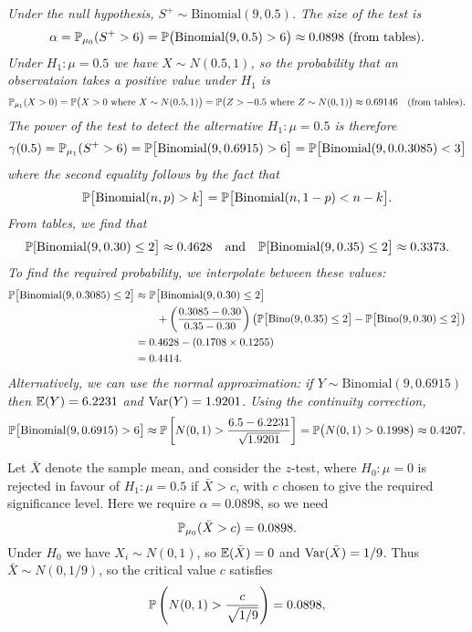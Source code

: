 \begin{exercise}
\begin{questions}
\begin{answer}
\ben
\it %
Under the null hypothesis, $S^{+}\sim\text{Binomial}(9, 0.5)$. The size of the test is
\[
\alpha = \mathbb{P}_{\mu_0}(S^{+}>6) = \mathbb{P}\big(\text{Binomial}(9,0.5)>6\big) \approx 0.0898 \text{ (from tables)}.
\]
Under $H_1:\mu=0.5$ we have $X\sim N(0.5,1)$, so the probability that an observataion takes a positive value under $H_1$ is
\[
\mathbb{P}_{\mu_1}(X > 0) 
	= \mathbb{P}\big(X > 0 \text{ where } X\sim N(0.5,1)\big) 
	= \mathbb{P}\big(Z > -0.5 \text{ where } Z\sim N(0,1)\big) 
	\approx 0.69146 \quad\text{(from tables).}
\]
The power of the test to detect the alternative $H_1:\mu=0.5$ is therefore
\[
\gamma(0.5) = \mathbb{P}_{\mu_1}(S^{+}>6) = \mathbb{P}\big[\text{Binomial}(9,0.6915) > 6\big] = \mathbb{P}\big[\text{Binomial}(9,0.0.3085) < 3\big] 
\]
where the second equality follows by the fact that 
\[
\mathbb{P}\big[\text{Binomial}(n,p) > k\big] = \mathbb{P}\big[\text{Binomial}(n,1-p) < n-k\big].
\]
From tables, we find that 
\[
\mathbb{P}[\text{Binomial}(9,0.30)\leq 2\big] \approx 0.4628  \quad\text{and}\quad \mathbb{P}[\text{Binomial}(9,0.35)\leq 2\big] \approx 0.3373.
\]
To find the required probability, we interpolate between these values:
\begin{align*}
\mathbb{P}\big[\text{Binomial}(9,0.3085)\leq 2\big]
	& \approx \mathbb{P}\big[\text{Binomial}(9,0.30)\leq 2\big] \\
	& \qquad + \left(\frac{0.3085 - 0.30}{0.35 - 0.30}\right)\left(\mathbb{P}\big[\text{Bino}(9,0.35)\leq 2\big]-\mathbb{P}\big[\text{Bino}(9,0.30)\leq 2\big]\right) \\
	& = 0.4628 - (0.1708\times 0.1255) \\
	& = 0.4414.
\end{align*}	
Alternatively, we can use the normal approximation: if $Y\sim \text{Binomial}(9,0.6915)$ then $\mathbb{E}(Y) = 6.2231$ and $\text{Var}(Y) = 1.9201$. Using the continuity correction,
\[
\mathbb{P}\big[\text{Binomial}(9,0.6915) > 6\big]
	\approx \mathbb{P}\left[ N (0,1) > \frac{6.5-6.2231}{\sqrt{1.9201}}\right]
	= \mathbb{P}\big(N(0,1)> 0.1998\big) 
	\approx 0.4207.
\]	
\item %
Let $\bar{X}$ denote the sample mean, and consider the $z$-test, where $H_0:\mu=0$ is rejected in favour of $H_1:\mu=0.5$ if $\bar{X} > c$, with $c$ chosen to give the required significance level. Here we require $\alpha = 0.0898$, so we need
\[
\mathbb{P}_{\mu_0}(\bar{X} > c) = 0.0898.
\]
Under $H_0$ we have $X_i\sim N (0,1)$, so $\mathbb{E}(\bar{X})=0$ and $\text{Var}(\bar{X})=1/9$. Thus $\bar{X}\sim N (0,1/9)$, so the critical value $c$ satisfies
\[
\mathbb{P}\left( N (0,1) > \frac{c}{\sqrt{1/9}}\right) = 0.0898,
\]
\end{answer}
\end{questions}
\end{exercise}
